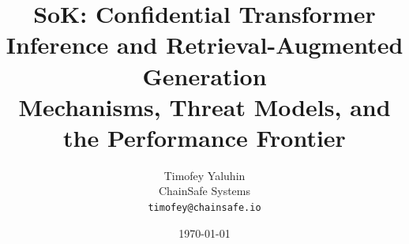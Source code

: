 \documentclass[10pt,letterpaper,twocolumn]{article}
\title{\textbf{SoK: Confidential Transformer Inference and Retrieval-Augmented
       Generation\\
       \large Mechanisms, Threat Models, and the Performance Frontier}}
\author{%
  Timofey Yaluhin \\ ChainSafe Systems \\
  \texttt{timofey@chainsafe.io}}
\date{\today}
\begin{document}
\maketitle

\begin{abstract}

\end{abstract}





\end{document}
